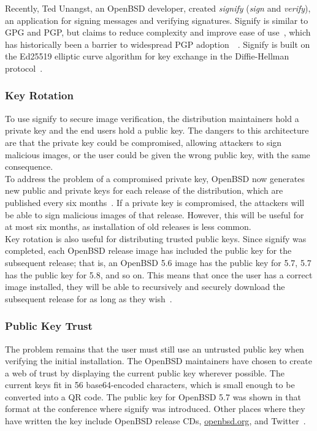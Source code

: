 \documentclass[conference]{IEEEtran}
\begin{document}
Recently, Ted Unangst, an OpenBSD developer, created \emph{signify} (\emph{sign} and
\emph{verify}), an application for signing messages and verifying signatures. Signify is
similar to GPG and PGP, but claims to reduce complexity and improve ease of use~\cite{signify},
which has historically been a barrier to widespread PGP adoption~\cite{whitten1999johnny}~\cite{sheng2006johnny}.
Signify is built on the Ed25519 elliptic curve algorithm for key exchange in the
Diffie-Hellman protocol~\cite{signify}.

\subsubsection{Key Rotation}
To use signify to secure image verification, the distribution maintainers hold a private
key and the end users hold a public key. The dangers to this architecture are that the
private key could be compromised, allowing attackers to sign malicious images, or the user
could be given the wrong public key, with the same consequence.\\
\indent To address the problem of a compromised private key, OpenBSD now generates new
public and private keys for each release of the distribution, which are published every
six months~\cite{openbsdrelease}. If a private key is compromised, the attackers will be able
to sign malicious images of that release. However, this will be useful for at most six months,
as installation of old releases is less common.\\
\indent Key rotation is also useful for distributing trusted public keys. Since signify was
completed, each OpenBSD release image has included the public key for the subsequent release;
that is, an OpenBSD 5.6 image has the public key for 5.7, 5.7 has the public key for 5.8, and
so on. This means that once the user has a correct image installed, they will be able to
recursively and securely download the subsequent release for as long as they wish~\cite{signify}.
\subsubsection{Public Key Trust\label{publickeytrust}}
The problem remains that the user must still use an untrusted public key when verifying the
initial installation. The OpenBSD maintainers have chosen to create a web of trust by displaying
the current public key wherever possible. The current keys fit in 56 base64-encoded characters,
which is small enough to be converted into a QR code. The public key for OpenBSD 5.7 was shown
in that format at the conference where signify was introduced. Other places where they have
written the key include OpenBSD release CDs, \url{openbsd.org}, and Twitter~\cite{signify}.
\end{document}
